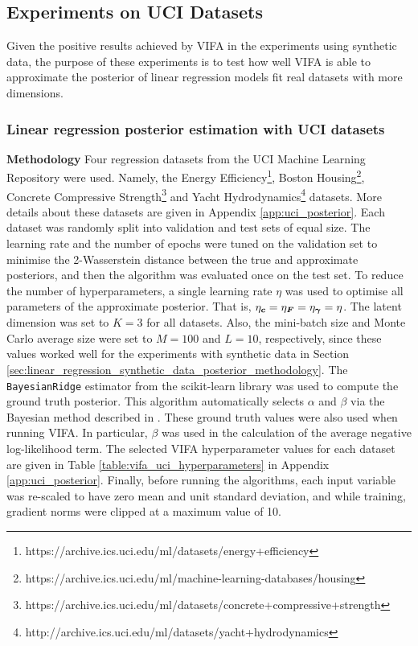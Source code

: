 \documentclass[10pt]{article} %
\newcommand{\vgamma}{\bm{\gamma}}
\begin{document}
\subsection{Experiments on UCI Datasets}
Given the positive results achieved by VIFA in the experiments using synthetic data, the purpose of these experiments is to test how well VIFA is able to approximate the posterior of linear regression models fit real datasets with more dimensions.

\subsubsection{Linear regression posterior estimation with UCI datasets}
\label{sec:vifa_posterior_uci}
\textbf{Methodology}  Four regression datasets from the UCI Machine Learning Repository \citep{dua2019} were used. Namely, the Energy Efficiency\footnote{https://archive.ics.uci.edu/ml/datasets/energy+efficiency}, Boston Housing\footnote{https://archive.ics.uci.edu/ml/machine-learning-databases/housing}, Concrete Compressive Strength\footnote{https://archive.ics.uci.edu/ml/datasets/concrete+compressive+strength} and Yacht Hydrodynamics\footnote{http://archive.ics.uci.edu/ml/datasets/yacht+hydrodynamics} datasets. More details about these datasets are given in Appendix \ref{app:uci_posterior}.  Each dataset was randomly split into validation and test sets of equal size. The learning rate and the number of epochs were tuned on the validation set to minimise the 2-Wasserstein distance between the true and approximate posteriors, and then the algorithm was evaluated once on the test set. To reduce the number of hyperparameters, a single learning rate $\eta$ was used to optimise all parameters of the approximate posterior. That is, $\eta_\vc = \eta_\mF = \eta_{\vgamma} = \eta$. The latent dimension was set to $K=3$ for all datasets. Also, the mini-batch size and Monte Carlo average size were set to $M=100$ and $L=10$, respectively, since these values worked well for the experiments with synthetic data in Section \ref{sec:linear_regression_synthetic_data_posterior_methodology}. The \texttt{BayesianRidge} estimator from the scikit-learn library \citep{pedregosa2012} was used to compute the ground truth posterior. This algorithm automatically selects $\alpha$ and $\beta$ via the Bayesian method described in \citep{mackay1992}. These ground truth values were also used when running VIFA. In particular, $\beta$ was used in the calculation of the average negative log-likelihood term. The selected VIFA hyperparameter values for each dataset are given in Table \ref{table:vifa_uci_hyperparameters} in Appendix \ref{app:uci_posterior}. Finally, before running the algorithms, each input variable was re-scaled to have zero mean and unit standard deviation, and while training, gradient norms were clipped at a maximum value of 10. 
\end{document}
